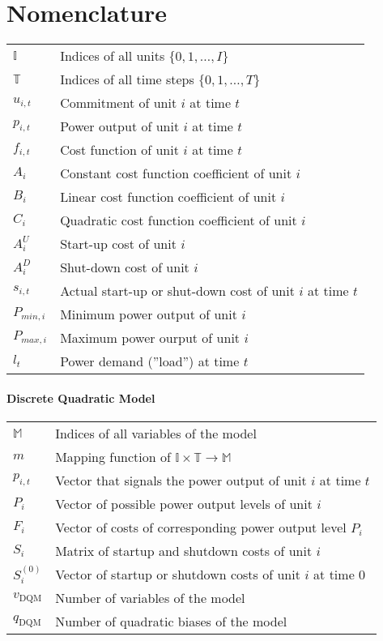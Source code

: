 \chapter*{Nomenclature}

\begin{tabular}{ll}
  $\mathbb{I}$ & Indices of all units $\{0, 1, \ldots, I\}$\\
  $\mathbb{T}$ & Indices of all time steps $\{0, 1, \ldots, T\}$ \\
  $u_{i, t}$ & Commitment of unit $i$ at time $t$ \\
  $p_{i, t}$ & Power output of unit $i$ at time $t$ \\
  $f_{i, t}$ & Cost function of unit $i$ at time $t$ \\
  $A_i$ & Constant cost function coefficient of unit $i$ \\
  $B_i$ & Linear cost function coefficient of unit $i$ \\
  $C_i$ & Quadratic cost function coefficient of unit $i$ \\
  $A^U_i$ & Start-up cost of unit $i$ \\
  $A^D_i$ & Shut-down cost of unit $i$ \\
  $s_{i, t}$ & Actual start-up or shut-down cost of unit $i$ at time $t$ \\
  $P_{min, i}$ & Minimum power output of unit $i$ \\
  $P_{max, i}$ & Maximum power ourput of unit $i$ \\
  $l_t$ & Power demand (''load'') at time $t$
\end{tabular}

\subsubsection{Discrete Quadratic Model}

\begin{tabular}{ll}
  $\mathbb{M}$ & Indices of all variables of the model \\
  $m$ & Mapping function of $\mathbb{I} \times \mathbb{T} \to \mathbb{M}$ \\
  $p_{i, t}$ & Vector that signals the power output of unit $i$ at time $t$ \\
  $P_{i}$ & Vector of possible power output levels of unit $i$ \\
  $F_{i}$ & Vector of costs of corresponding power output level $P_{i}$ \\
  $S_{i}$ & Matrix of startup and shutdown costs of unit $i$ \\
  $S_i^{(0)}$ & Vector of startup or shutdown costs of unit $i$ at time $0$ \\
  $v_{\text{DQM}}$ & Number of variables of the model \\
  $q_{\text{DQM}}$ & Number of quadratic biases of the model
\end{tabular}

